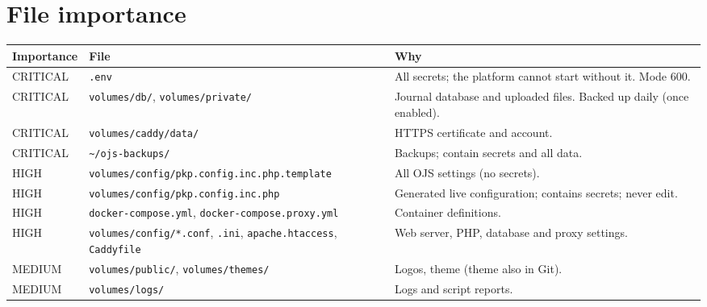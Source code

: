 \documentclass[11pt,a4paper]{report}
\newcommand{\file}[1]{\texttt{\small #1}}
\begin{document}
\chapter{File importance}\label{app:files}
\begin{tabularx}{\linewidth}{@{}lP{6cm}L@{}}
\toprule
\textbf{Importance} & \textbf{File} & \textbf{Why} \\
\midrule
CRITICAL & \file{.env} & All secrets; the platform cannot start without it. Mode 600. \\
CRITICAL & \file{volumes/db/}, \file{volumes/private/} & Journal database and uploaded files. Backed up daily (once enabled). \\
CRITICAL & \file{volumes/caddy/data/} & HTTPS certificate and account. \\
CRITICAL & \file{\textasciitilde/ojs-backups/} & Backups; contain secrets and all data. \\
HIGH & \file{volumes/config/\allowbreak pkp.config.inc.php.template} & All OJS settings (no secrets). \\
HIGH & \file{volumes/config/\allowbreak pkp.config.inc.php} & Generated live configuration; contains secrets; never edit. \\
HIGH & \file{docker-compose.yml}, \file{docker-compose.proxy.yml} & Container definitions. \\
HIGH & \file{volumes/config/*.conf}, \file{*.ini}, \file{apache.htaccess}, \file{Caddyfile} & Web server, PHP, database and proxy settings. \\
MEDIUM & \file{volumes/public/}, \file{volumes/themes/} & Logos, theme (theme also in Git). \\
MEDIUM & \file{volumes/logs/} & Logs and script reports. \\
\bottomrule
\end{tabularx}
\end{document}
